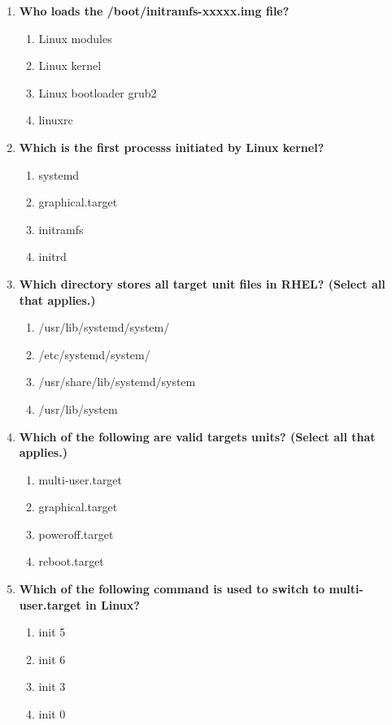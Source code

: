 \begin{flushleft}
\begin{enumerate}
		\item \textbf{Who loads the /boot/initramfs-xxxxx.img file?}
		\begin{enumerate}[label=(\alph*)]
			\item Linux modules
			\item Linux kernel   %
			\item Linux bootloader grub2  
			\item linuxrc
		\end{enumerate}
		\bigskip
		\bigskip	

		\item \textbf{Which is the first processs initiated by Linux kernel?}
		\begin{enumerate}[label=(\alph*)]
			\item systemd  %
			\item graphical.target
			\item initramfs
			\item initrd
		\end{enumerate}
		\bigskip
		\bigskip

		\item \textbf{Which directory stores all target unit files in RHEL? (Select all that applies.)}
		\begin{enumerate}[label=(\alph*)]
			\item /usr/lib/systemd/system/  %
			\item /etc/systemd/system/  %
			\item /usr/share/lib/systemd/system
			\item /usr/lib/system
		\end{enumerate}
		\bigskip
		\bigskip

		\item \textbf{Which of the following are valid targets units? (Select all that applies.)}
		\begin{enumerate}[label=(\alph*)]
			\item multi-user.target  %
			\item graphical.target  %
			\item poweroff.target  %
			\item reboot.target    %
		\end{enumerate}
		\bigskip
		\bigskip

		\item \textbf{Which of the following command is used to switch to multi-user.target in Linux?}
		\begin{enumerate}[label=(\alph*)]
			\item init 5 
			\item init 6 
			\item init 3  %
			\item init 0 
		\end{enumerate}
		\bigskip
		\bigskip


\end{enumerate}
\end{flushleft}
